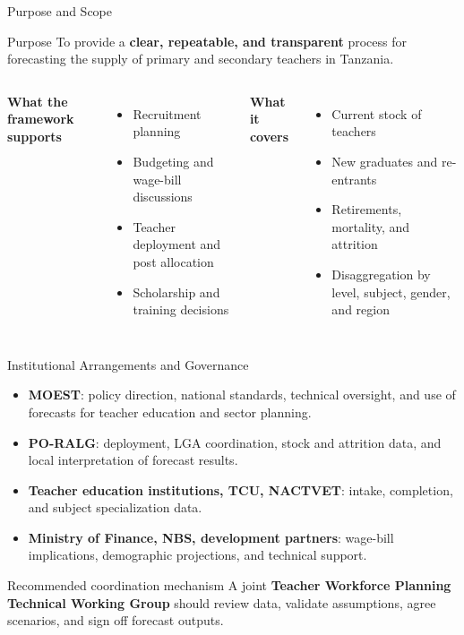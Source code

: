 \documentclass[
  11pt,
  ignorenonframetext,
  aspectratio=169,
  11pt]{beamer}
\newcommand{\highlight}[1]{\textcolor{DavidsonBlueDark}{\textbf{#1}}}
\begin{document}
\begin{frame}{Purpose and Scope}
\begin{block}{Purpose}
\justifying
To provide a \highlight{clear, repeatable, and transparent} process for forecasting the supply of primary and secondary teachers in Tanzania.
\end{block}
\vspace{0.15cm}
\begin{columns}[T,onlytextwidth]
\textbf{What the framework supports}
\begin{itemize}
  \item Recruitment planning
  \item Budgeting and wage-bill discussions
  \item Teacher deployment and post allocation
  \item Scholarship and training decisions
\end{itemize}
\textbf{What it covers}
\begin{itemize}
  \item Current stock of teachers
  \item New graduates and re-entrants
  \item Retirements, mortality, and attrition
  \item Disaggregation by level, subject, gender, and region
\end{itemize}
\end{columns}
\end{frame}

\begin{frame}{Institutional Arrangements and Governance}
\begin{itemize}
  \item \highlight{MOEST}: policy direction, national standards, technical oversight, and use of forecasts for teacher education and sector planning.
  \item \highlight{PO-RALG}: deployment, LGA coordination, stock and attrition data, and local interpretation of forecast results.
  \item \highlight{Teacher education institutions, TCU, NACTVET}: intake, completion, and subject specialization data.
  \item \highlight{Ministry of Finance, NBS, development partners}: wage-bill implications, demographic projections, and technical support.
\end{itemize}
\vspace{0.25cm}
\begin{block}{Recommended coordination mechanism}
A joint \highlight{Teacher Workforce Planning Technical Working Group} should review data, validate assumptions, agree scenarios, and sign off forecast outputs.
\end{block}
\end{frame}
\end{document}
